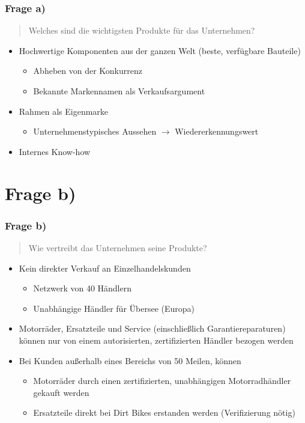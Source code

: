 \documentclass{beamer}
\begin{document}
\begin{frame}
\frametitle{Frage a)}

\begin{quote}
Welches sind die wichtigsten Produkte für das Unternehmen?
\end{quote}

\begin{itemize}
\setlength{\itemsep}{20pt}
\item Hochwertige Komponenten aus der ganzen Welt (beste, verf\"ugbare Bauteile)
\begin{itemize}
\item Abheben von der Konkurrenz
\item Bekannte Markennamen als Verkaufsargument
\end{itemize}
\item Rahmen als Eigenmarke
\begin{itemize}
\item Unternehmenstypisches Aussehen $\rightarrow$ Wiedererkennungswert
\end{itemize}
\item Internes Know-how
\end{itemize}

\end{frame}

\section{Frage b)}
\begin{frame}
\frametitle{Frage b)}

\begin{quote}
Wie vertreibt das Unternehmen seine Produkte?
\end{quote}

\begin{itemize}
\setlength{\itemsep}{14pt}
\item Kein direkter Verkauf an Einzelhandelskunden
\begin{itemize}
\item Netzwerk von 40 H\"andlern
\item Unabh\"angige H\"andler f\"ur \"Ubersee (Europa)
\end{itemize}
\item Motorr\"ader, Ersatzteile und Service (einschließlich Garantiereparaturen) können nur von einem autorisierten, zertifizierten H\"andler bezogen werden
\item Bei Kunden außerhalb eines Bereichs von 50 Meilen, k\"onnen 
\begin{itemize}
\item Motorr\"ader durch einen zertifizierten, unabhängigen Motorradh\"andler gekauft werden
\item Ersatzteile direkt bei Dirt Bikes erstanden werden (Verifizierung n\"otig)
\end{itemize}
\end{itemize}

\end{frame}
\end{document}
